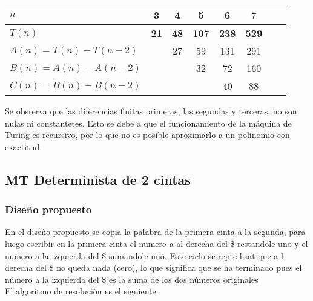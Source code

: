 \begin{table}[h]
    \centering
    \begin{tabular}{|l|c|c|c|c|c|c|c|}
        \hline
        $n$ & \textbf{3} & \textbf{4} & \textbf{5} & \textbf{6} & \textbf{7}\\ \hline
        $T(n)$ & \textbf{21} & \textbf{48} & \textbf{107} & \textbf{238} & \textbf{529}      \\ \hline
        \hline
        $A(n) = T(n) - T(n-2)$ &    & 27 & 59 & 131 & 291 \\ \hline
        $B(n) = A(n) - A(n-2)$ &    &   & 32 & 72 & 160 \\ \hline
        $C(n) = B(n) - B(n-2)$ &    &   &    & 40 & 88 \\ \hline
    \end{tabular}
\end{table}

Se obsrerva que las diferencias finitas primeras, las segundas y terceras, no son nulas ni constantetes. Esto se debe a que el funcionamiento de la máquina de Turing es recursivo, por lo que no es posible aproximarlo a un polinomio con exactitud.\\





\subsection{MT Determinista de 2 cintas}

\subsubsection*{Diseño propuesto}

En el diseño propuesto se copia la palabra de la primera cinta a la segunda, para luego escribir en la primera cinta el numero a al derecha del \$ restandole uno y el numero a la izquierda del \$ sumandole uno. Este ciclo se repte hsat que a l derecha del \$ no queda nada (cero), lo que significa que se ha terminado pues el número a la izquierda del \$ es la suma de los dos números originales \\

El algoritmo de resolución es el siguiente:

